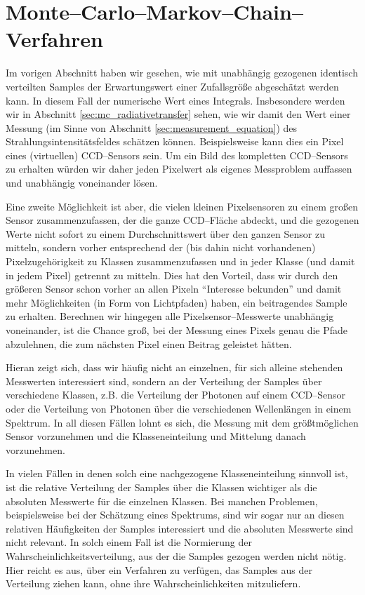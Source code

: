 	\chapter{Monte--Carlo--Markov--Chain--Verfahren}\label{chapter:mcmc}
	Im vorigen Abschnitt haben wir gesehen, wie mit unabhängig gezogenen identisch verteilten Samples der Erwartungswert einer Zufallsgröße abgeschätzt werden kann. In diesem Fall der numerische Wert eines Integrals. Insbesondere werden wir in Abschnitt \ref{sec:mc_radiativetransfer} sehen, wie wir damit den Wert einer Messung (im Sinne von Abschnitt \ref{sec:measurement_equation}) des Strahlungsintensitätsfeldes schätzen können. Beispielsweise kann dies ein Pixel eines (virtuellen) CCD--Sensors sein. Um ein Bild des kompletten CCD--Sensors zu erhalten würden wir daher jeden Pixelwert als eigenes Messproblem auffassen und unabhängig voneinander lösen.
	
	Eine zweite Möglichkeit ist aber, die vielen kleinen Pixelsensoren zu einem großen Sensor zusammenzufassen, der die ganze CCD--Fläche abdeckt, und die gezogenen Werte nicht sofort zu einem Durchschnittswert über den ganzen Sensor zu mitteln, sondern vorher entsprechend der (bis dahin nicht vorhandenen) Pixelzugehörigkeit zu Klassen zusammenzufassen und in jeder Klasse (und damit in jedem Pixel) getrennt zu mitteln. Dies hat den Vorteil, dass wir durch den größeren Sensor schon vorher an allen Pixeln ``Interesse bekunden'' und damit mehr Möglichkeiten (in Form von Lichtpfaden) haben, ein beitragendes Sample zu erhalten. Berechnen wir hingegen alle Pixelsensor--Messwerte unabhängig voneinander, ist die Chance groß, bei der Messung eines Pixels genau die Pfade abzulehnen, die zum nächsten Pixel einen Beitrag geleistet hätten.
	
	Hieran zeigt sich, dass wir häufig nicht an einzelnen, für sich alleine stehenden Messwerten interessiert sind, sondern an der Verteilung der Samples über verschiedene Klassen, z.B. die Verteilung der Photonen auf einem CCD--Sensor oder die Verteilung von Photonen über die verschiedenen Wellenlängen in einem Spektrum. In all diesen Fällen lohnt es sich, die Messung mit dem größtmöglichen Sensor vorzunehmen und die Klasseneinteilung und Mittelung danach vorzunehmen.

	In vielen Fällen in denen solch eine nachgezogene Klasseneinteilung sinnvoll ist, ist die relative Verteilung der Samples über die Klassen wichtiger als die absoluten Messwerte für die einzelnen Klassen. Bei manchen Problemen, beispielsweise bei der Schätzung eines Spektrums, sind wir sogar nur an diesen relativen Häufigkeiten der Samples interessiert und die absoluten Messwerte sind nicht relevant. In solch einem Fall ist die Normierung der Wahrscheinlichkeitsverteilung, aus der die Samples gezogen werden nicht nötig. Hier reicht es aus, über ein Verfahren zu verfügen, das Samples aus der Verteilung ziehen kann, ohne ihre Wahrscheinlichkeiten mitzuliefern.
	
